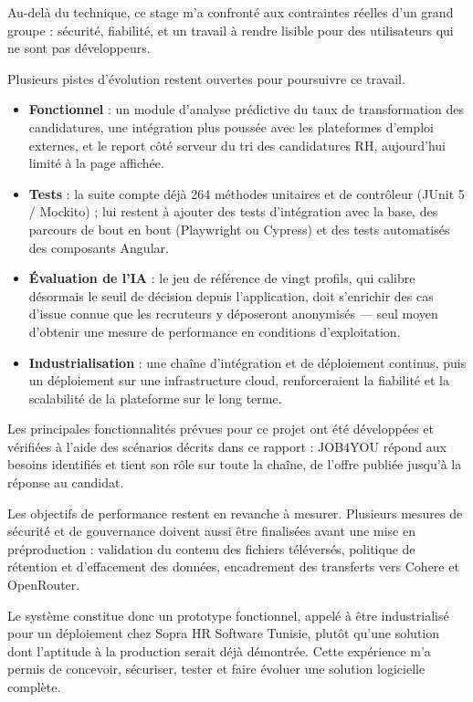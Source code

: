 \documentclass[]{./tpl/isipfe}
\begin{document}
Au-delà du technique, ce stage m’a confronté aux contraintes réelles d’un grand groupe : sécurité, fiabilité, et un travail à rendre lisible pour des utilisateurs qui ne sont pas développeurs.

Plusieurs pistes d’évolution restent ouvertes pour poursuivre ce travail.
\begin{itemize}
\item \textbf{Fonctionnel} : un module d’analyse prédictive du taux de transformation des candidatures, une intégration plus poussée avec les plateformes d’emploi externes, et le report côté serveur du tri des candidatures RH, aujourd’hui limité à la page affichée.
\item \textbf{Tests} : la suite compte déjà 264 méthodes unitaires et de contrôleur (JUnit 5 / Mockito) ; lui restent à ajouter des tests d’intégration avec la base, des parcours de bout en bout (Playwright ou Cypress) et des tests automatisés des composants Angular.
\item \textbf{Évaluation de l’IA} : le jeu de référence de vingt profils, qui calibre désormais le seuil de décision depuis l’application, doit s’enrichir des cas d’issue connue que les recruteurs y déposeront anonymisés — seul moyen d’obtenir une mesure de performance en conditions d’exploitation.
\item \textbf{Industrialisation} : une chaîne d’intégration et de déploiement continus, puis un déploiement sur une infrastructure cloud, renforceraient la fiabilité et la scalabilité de la plateforme sur le long terme.
\end{itemize}

Les principales fonctionnalités prévues pour ce projet ont été développées et vérifiées à l’aide des scénarios décrits dans ce rapport : JOB4YOU répond aux besoins identifiés et tient son rôle sur toute la chaîne, de l’offre publiée jusqu’à la réponse au candidat.

Les objectifs de performance restent en revanche à mesurer. Plusieurs mesures de sécurité et de gouvernance doivent aussi être finalisées avant une mise en préproduction : validation du contenu des fichiers téléversés, politique de rétention et d’effacement des données, encadrement des transferts vers Cohere et OpenRouter.

Le système constitue donc un prototype fonctionnel, appelé à être industrialisé pour un déploiement chez Sopra HR Software Tunisie, plutôt qu’une solution dont l’aptitude à la production serait déjà démontrée. Cette expérience m’a permis de concevoir, sécuriser, tester et faire évoluer une solution logicielle complète.
\end{document}
